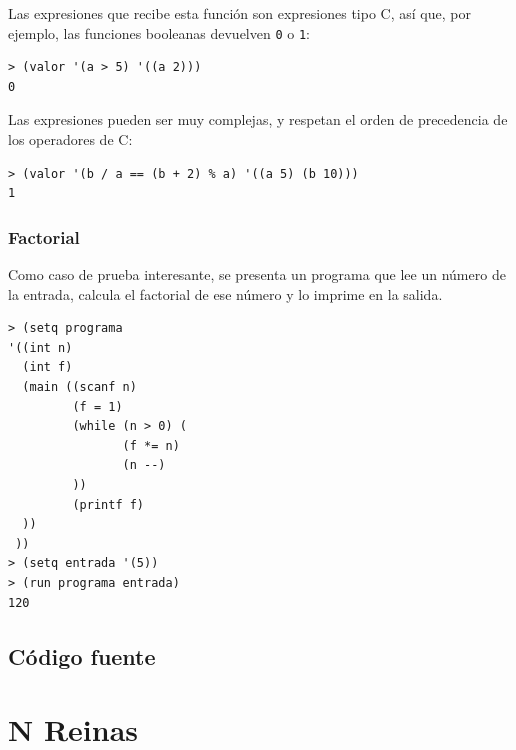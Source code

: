 \documentclass[12pt,titlepage]{article}
\begin{document}
Las expresiones que recibe esta función son expresiones tipo C, así que, por ejemplo, las funciones booleanas devuelven \lstinline|0| o \lstinline|1|:
\begin{lstlisting}
> (valor '(a > 5) '((a 2)))
0
\end{lstlisting}

Las expresiones pueden ser muy complejas, y respetan el orden de precedencia de los operadores de C:
\begin{lstlisting}
> (valor '(b / a == (b + 2) % a) '((a 5) (b 10)))
1
\end{lstlisting}

\subsubsection{Factorial}

Como caso de prueba interesante, se presenta un programa que lee un número de la entrada, calcula el factorial de ese número y lo imprime en la salida.
\begin{lstlisting}
> (setq programa 
'((int n)
  (int f)
  (main ((scanf n)
         (f = 1)
         (while (n > 0) (
                (f *= n)
                (n --)
         ))
         (printf f)
  ))
 ))
> (setq entrada '(5))
> (run programa entrada)
120
\end{lstlisting}

\subsection{Código fuente}



\section{N Reinas}

\end{document}
